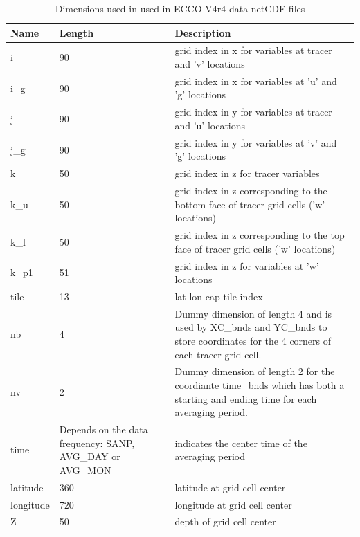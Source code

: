 \begin{longtable}{|p{}|p{}|m{}|}
\caption{Dimensions used in used in ECCO V4r4 data netCDF files}
\label{tab:variable-attributes} \\ 
\hline \endhead
\hline \endfoot
\rowcolor{blue!25} \textbf{Name} & \textbf{Length} & \textbf{Description} \\ \hline
\rowcolor{magenta!25}
i & 90 & grid index in x for variables at tracer and 'v' locations \\ \hline
\rowcolor{magenta!25}
i\_g & 90 & grid index in x for variables at 'u' and 'g' locations \\ \hline
\rowcolor{magenta!25}
j & 90 & grid index in y for variables at tracer and 'u' locations \\ \hline
\rowcolor{magenta!25}
j\_g & 90 & grid index in y for variables at 'v' and 'g' locations \\ \hline
\rowcolor{magenta!25}
k & 50 & grid index in z for tracer variables \\ \hline
\rowcolor{magenta!25}
k\_u & 50 & grid index in z corresponding to the bottom face of tracer grid cells ('w' locations) \\ \hline
\rowcolor{magenta!25}
k\_l & 50 & grid index in z corresponding to the top face of tracer grid cells ('w' locations) \\ \hline
\rowcolor{magenta!25}
k\_p1 & 51 & grid index in z for variables at 'w' locations \\ \hline
\rowcolor{magenta!25}
tile & 13 & lat-lon-cap tile index \\ \hline
\rowcolor{magenta!25}
nb & 4 & Dummy dimension of length 4 and is used by XC\_bnds and YC\_bnds to store coordinates for the 4 corners of each tracer grid cell. \\ \hline
\rowcolor{magenta!25}
nv & 2 & Dummy dimension of length 2 for the coordiante time\_bnds which has both a starting and ending time for each averaging period. \\ \hline
\rowcolor{magenta!25}
time & Depends on the data frequency: SANP, AVG\_DAY or AVG\_MON & indicates the center time of the averaging period \\ \hline
\rowcolor{magenta!25}
latitude & 360 & latitude at grid cell center \\ \hline
\rowcolor{magenta!25}
longitude & 720 & longitude at grid cell center \\ \hline
\rowcolor{magenta!25}
Z & 50 & depth of grid cell center \\ \hline
\end{longtable}
